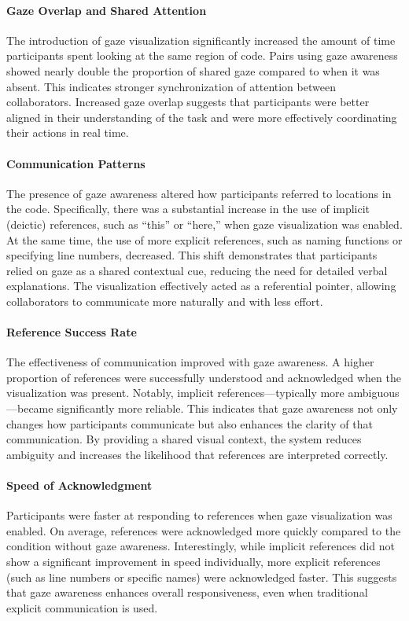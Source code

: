 \paragraph{Gaze Overlap and Shared Attention}
The introduction of gaze visualization significantly increased the amount of time participants spent looking at the same region of code. Pairs using gaze awareness showed nearly double the proportion of shared gaze compared to when it was absent. This indicates stronger synchronization of attention between collaborators. Increased gaze overlap suggests that participants were better aligned in their understanding of the task and were more effectively coordinating their actions in real time.

\paragraph{Communication Patterns}
The presence of gaze awareness altered how participants referred to locations in the code. Specifically, there was a substantial increase in the use of implicit (deictic) references, such as “this” or “here,” when gaze visualization was enabled. At the same time, the use of more explicit references, such as naming functions or specifying line numbers, decreased. This shift demonstrates that participants relied on gaze as a shared contextual cue, reducing the need for detailed verbal explanations. The visualization effectively acted as a referential pointer, allowing collaborators to communicate more naturally and with less effort.

\paragraph{Reference Success Rate}
The effectiveness of communication improved with gaze awareness. A higher proportion of references were successfully understood and acknowledged when the visualization was present. Notably, implicit references—typically more ambiguous—became significantly more reliable. This indicates that gaze awareness not only changes how participants communicate but also enhances the clarity of that communication. By providing a shared visual context, the system reduces ambiguity and increases the likelihood that references are interpreted correctly.

\paragraph{Speed of Acknowledgment}
Participants were faster at responding to references when gaze visualization was enabled. On average, references were acknowledged more quickly compared to the condition without gaze awareness. Interestingly, while implicit references did not show a significant improvement in speed individually, more explicit references (such as line numbers or specific names) were acknowledged faster. This suggests that gaze awareness enhances overall responsiveness, even when traditional explicit communication is used.

